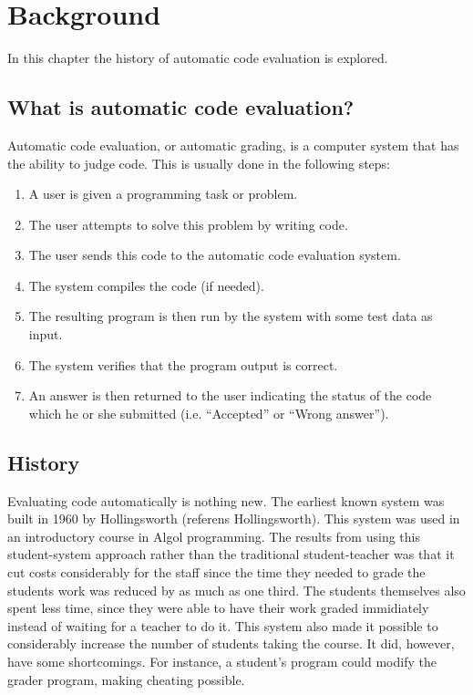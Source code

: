 \chapter{Background}
In this chapter the history of automatic code evaluation is explored.

\section{What is automatic code evaluation?}
Automatic code evaluation, or automatic grading, is a computer system that has the ability to judge code. This is usually done in the following steps:
\begin{enumerate}
  \item A user is given a programming task or problem.
  \item The user attempts to solve this problem by writing code.
  \item The user sends this code to the automatic code evaluation system.
  \item The system compiles the code (if needed).
  \item The resulting program is then run by the system with some test data as input.
  \item The system verifies that the program output is correct. 
  \item An answer is then returned to the user indicating the status of the code which he or she submitted (i.e. ``Accepted'' or ``Wrong answer'').
\end{enumerate}


\section{History}
Evaluating code automatically is nothing new. The earliest known system was built in 1960 by Hollingsworth (referens Hollingsworth). This system was used in an introductory course in Algol programming. The results from using this student-system approach rather than the traditional student-teacher was that it cut costs considerably for the staff since the time they needed to grade the students work was reduced by as much as one third. The students themselves also spent less time, since they were able to have their work graded immidiately instead of waiting for a teacher to do it. This system also made it possible to considerably increase the number of students taking the course. It did, however, have some shortcomings. For instance, a student's program could modify the grader program, making cheating possible. 


